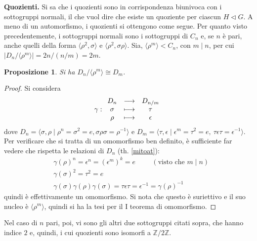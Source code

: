 \documentclass[11pt]{article}
\theoremstyle{style}
\newtheorem{prop}{Proposizione}[section]
\numberwithin{equation}{subsection}
\renewcommand{\textbf}[1]{\textsf{\bfseries #1}}
\begin{document}
\textbf{Quozienti.} 
Si sa che i quozienti sono in corrispondenza biunivoca con i sottogruppi normali, il che vuol dire che esiste un quoziente per ciascun $H \lhd G$.
A meno di un automorfismo, i quozienti si ottengono come segue.
Per quanto visto precedentemente, i sottogruppi normali sono i sottogruppi di $C_n$ e, se $n$ \`e pari, anche quelli della forma $\langle \rho ^2 , \sigma  \rangle$ e $\langle \rho ^2, \sigma \rho  \rangle$. 
Sia, $\langle \rho ^m \rangle< C_n$, con $ m \mid n$, per cui $\lvert D_n / \langle \rho ^m \rangle \rvert = 2n/(n / m) = 2m$.
\begin{prop}
	Si ha $D_n / \langle \rho ^m \rangle\cong D _{m} $.
\end{prop}
	\begin{proof}
		Si considera 
		\[
		\gamma : 
		\begin{array}
			{c c c}
			D_n & \longrightarrow& D_{ n / m } \\
			\sigma & \longmapsto & \tau \\
			\rho & \longmapsto & \epsilon 
		\end{array}
		\] 
		dove $D_n = \langle \sigma ,\rho  \mid \rho ^n = \sigma ^2 = e , \sigma \rho \sigma = \rho ^{-1} \rangle$ e $D_{m} = \langle \tau ,\epsilon  \mid \epsilon ^{ m} = \tau ^2 = e , \ \tau \epsilon \tau = \epsilon ^{-1} \rangle$.
		Per verificare che si tratta di un omomorfismo ben definito, \`e sufficiente far vedere che rispetta le relazioni di $D_n$ (th. \ref{mitoat}):
		\[
			\begin{split}
				&\gamma(\rho )^n=\epsilon ^n = (\epsilon ^m)^k =e \hspace{1cm} (\text{visto che }m  \mid  n)\\
				&\gamma(\sigma )^2 = \tau ^2 = e\\
				&\gamma(\sigma )\gamma(\rho )\gamma(\sigma ) = \tau \epsilon \tau =\epsilon ^{-1}= \gamma(\rho )^{-1}
			\end{split}
		\] 
		quindi \`e effettivamente un omomorfismo.
		Si nota che questo \`e suriettivo e il suo nucleo \`e $\langle \rho ^m \rangle$, quindi si ha la tesi per il I teorema di omomorfismo.
	\end{proof}
\noindent Nel caso di $n$ pari, poi, vi sono gli altri due sottogruppi citati sopra, che hanno indice $2$ e, quindi, i cui quozienti sono isomorfi a $\mathbb{Z} / 2\mathbb{Z}$.
\end{document}
